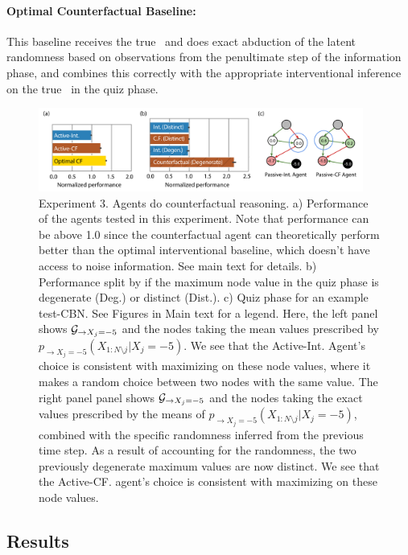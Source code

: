 \paragraph{Optimal Counterfactual Baseline:}
This baseline receives the true \CBN~and does exact abduction of the latent randomness based on observations from the penultimate step of the information phase, and combines this correctly with the appropriate interventional inference on the true \CBN~in the quiz phase.


\begin{figure}[t!]
\centering
   \includegraphics[width=0.95\textwidth]{figures/fig_expt3.pdf}
    \caption{Experiment 3.  Agents do counterfactual reasoning. a) Performance of the agents tested in this experiment. Note that performance can be above 1.0 since the counterfactual agent can theoretically perform better than the optimal interventional baseline, which doesn't have access to noise information. See main text for details. b) Performance split by if the maximum node value in the quiz phase is degenerate (Deg.) or distinct (Dist.). c) Quiz phase for an example test-CBN. See Figures in Main text for a legend. Here, the left panel shows ${\cal G}_{\rightarrow X_j=-5}$ and the nodes taking the mean values prescribed by $p_{\rightarrow X_j=-5}(X_{1:N\setminus j }|X_j=-5)$. We see that the Active-Int. Agent's choice is consistent with maximizing on these node values, where it makes a random choice between two nodes with the same value. The right panel panel shows ${\cal G}_{\rightarrow X_j=-5}$ and the nodes taking the exact values prescribed by the means of $p_{\rightarrow X_j=-5}(X_{1:N\setminus j }|X_j=-5)$, combined with the specific randomness inferred from the previous time step. As a result of accounting for the randomness, the two previously degenerate maximum values are now distinct. We see that the Active-CF. agent's choice is consistent with maximizing on these node values.}%
    \label{fig:expt3}%
\end{figure}



\subsection{Results}

